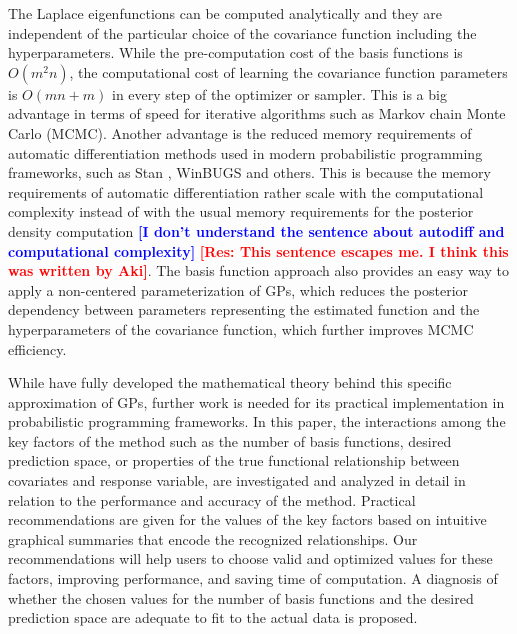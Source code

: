 \documentclass[onecolumn,a4paper,11pt]{article}
\newcommand{\todo}[1]{\textcolor{blue}{\textbf{[#1]}}}
\newcommand{\resp}[1]{\textcolor{red}{\textbf{[#1]}}}
\begin{document}
The Laplace eigenfunctions can be computed analytically and they are independent of the particular choice of the covariance function including the hyperparameters. While the pre-computation cost of the basis functions is $O(m^2n)$, the computational cost of learning the covariance function parameters is $O(mn+m)$ in every step of the optimizer or sampler. This is a big advantage in terms of speed for iterative algorithms such as Markov chain Monte Carlo (MCMC). Another advantage is the reduced memory requirements of automatic differentiation methods used in modern probabilistic programming frameworks, such as Stan \citep{carpenter2017stan}, WinBUGS \citep{lunn2000winbugs} and others. This is because the memory requirements of automatic differentiation rather scale with the computational complexity instead of with the usual memory requirements for the posterior density computation \todo{I don't understand the sentence about autodiff and computational complexity} \resp{Res: This sentence escapes me. I think this was written by Aki}. The basis function approach also provides an easy way to apply a non-centered parameterization of GPs, which reduces the posterior dependency between parameters representing the estimated function and the hyperparameters of the covariance function, which further improves MCMC efficiency.


While \citet{solin2018hilbert} have fully developed the mathematical theory behind this specific approximation of GPs, further work is needed for its practical implementation in probabilistic programming frameworks. In this paper, the interactions among the key factors of the method such as the number of basis functions, desired prediction space, or properties of the true functional relationship between covariates and response variable, are investigated and analyzed in detail in relation to the performance and accuracy of the method. Practical recommendations are given for the values of the key factors based on intuitive graphical summaries that encode the recognized relationships. Our recommendations will help users to choose valid and optimized values for these factors, improving performance, and saving time of computation. A diagnosis of whether the chosen values for the number of basis functions and the desired prediction space are adequate to fit to the actual data is proposed.
\end{document}
